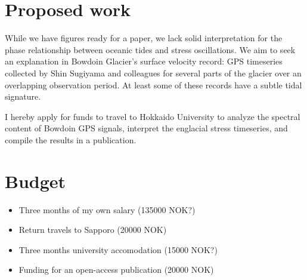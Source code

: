 \documentclass{article}
\begin{document}
\section{Proposed work}

    While we have figures ready for a paper, we lack solid
    interpretation for the phase relationship between oceanic tides and stress
    oscillations. We aim to seek an explanation in Bowdoin Glacier's surface
    velocity record: GPS timeseries collected by Shin Sugiyama and colleagues
    for several parts of the glacier over an overlapping observation period. At
    least some of these records have a subtle tidal signature.

    I hereby apply for funds to travel to Hokkaido University to analyze the
    spectral content of Bowdoin GPS signals, interpret the englacial stress
    timeseries, and compile the results in a publication.

\section{Budget}

    \begin{itemize}
        \item Three months of my own salary (135000 NOK?)
        \item Return travels to Sapporo (20000 NOK)
        \item Three months university accomodation (15000 NOK?)
        \item Funding for an open-access publication (20000 NOK)
    \end{itemize}

\end{document}
